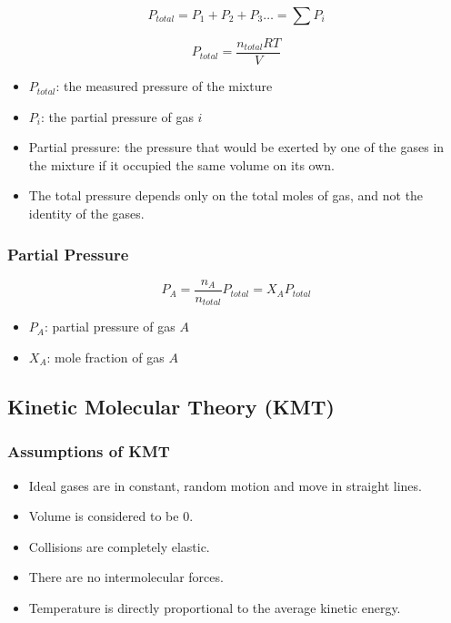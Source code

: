 \documentclass{article}
\begin{document}
\begin{equation*}
    P_{total} = P_1 + P_2 + P_3 \dots = \sum P_i
\end{equation*}

\begin{equation*}
    P_{total} = \frac{n_{total} RT}{V}
\end{equation*}

\begin{itemize}
    \item $P_{total}$: the measured pressure of the mixture
    \item $P_i$: the partial pressure of gas $i$
    \item Partial pressure: the pressure that would be exerted by one of the gases in the mixture if it occupied the same volume on its own.
    \item The total pressure depends only on the total moles of gas, and not the identity of the gases.
\end{itemize}

\subsubsection{Partial Pressure}

\begin{equation*}
    P_A = \frac{n_A}{n_{total}} P_{total} = X_A P_{total}
\end{equation*}

\begin{itemize}
    \item $P_A$: partial pressure of gas $A$
    \item $X_A$: mole fraction of gas $A$
\end{itemize}

\subsection{Kinetic Molecular Theory (KMT)}

\subsubsection{Assumptions of KMT}

\begin{itemize}
    \item Ideal gases are in constant, random motion and move in straight lines.
    \item Volume is considered to be $0$.
    \item Collisions are completely elastic.
    \item There are no intermolecular forces.
    \item Temperature is directly proportional to the average kinetic energy.
\end{itemize}
\end{document}

